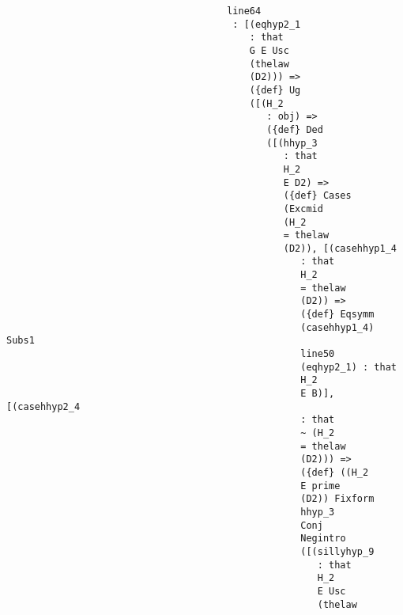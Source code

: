 \documentclass[12pt]{article}
\begin{document}
\begin{verbatim}
                                       line64 
                                        : [(eqhyp2_1 
                                           : that 
                                           G E Usc 
                                           (thelaw 
                                           (D2))) => 
                                           ({def} Ug 
                                           ([(H_2 
                                              : obj) => 
                                              ({def} Ded 
                                              ([(hhyp_3 
                                                 : that 
                                                 H_2 
                                                 E D2) => 
                                                 ({def} Cases 
                                                 (Excmid 
                                                 (H_2 
                                                 = thelaw 
                                                 (D2)), [(casehhyp1_4 
                                                    : that 
                                                    H_2 
                                                    = thelaw 
                                                    (D2)) => 
                                                    ({def} Eqsymm 
                                                    (casehhyp1_4) Subs1 
                                                    line50 
                                                    (eqhyp2_1) : that 
                                                    H_2 
                                                    E B)], [(casehhyp2_4 
                                                    : that 
                                                    ~ (H_2 
                                                    = thelaw 
                                                    (D2))) => 
                                                    ({def} ((H_2 
                                                    E prime 
                                                    (D2)) Fixform 
                                                    hhyp_3 
                                                    Conj 
                                                    Negintro 
                                                    ([(sillyhyp_9 
                                                       : that 
                                                       H_2 
                                                       E Usc 
                                                       (thelaw 

\end{verbatim}
\end{document}
